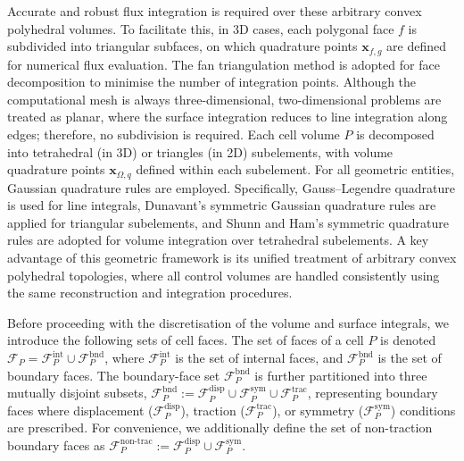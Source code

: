 \documentclass[review,3p]{elsarticle}
\newcommand{\bb}{\boldsymbol}
\begin{document}
%
%
Accurate and robust flux integration is required over these arbitrary convex polyhedral volumes.
To facilitate this, in 3D cases, each polygonal face $f$ is subdivided into triangular subfaces,
on which quadrature points $\bb{x}_{f,g}$ are defined for numerical flux evaluation.
The fan triangulation method is adopted for face decomposition to minimise the number of integration points.
Although the computational mesh is always three-dimensional, two-dimensional problems are treated as planar, where the surface integration reduces to line integration along edges; therefore, no subdivision is required.
Each cell volume $P$ is decomposed into tetrahedral (in 3D) or triangles (in 2D) subelements, with volume quadrature points $\bb{x}_{\Omega,q}$ defined within each subelement.
For all geometric entities, Gaussian quadrature rules are employed.
Specifically, Gauss–Legendre quadrature is used for line integrals,
Dunavant’s symmetric Gaussian quadrature rules \cite{Dunavant1985} are applied for triangular subelements,
and Shunn and Ham’s symmetric quadrature rules \cite{Shunn2012} are adopted for volume integration over tetrahedral subelements.
A key advantage of this geometric framework is its unified treatment of arbitrary convex polyhedral topologies, where all control volumes are handled consistently using the same reconstruction and integration procedures.

Before proceeding with the discretisation of the volume and surface integrals, we introduce the following sets of cell faces.
The set of faces of a cell $P$ is denoted $\mathcal{F}_P=\mathcal{F}^{\text{int}}_P \cup \mathcal{F}^{\text{bnd}}_P$, 
where $\mathcal{F}_P^{\text{int}}$ is the set of internal faces, and $\mathcal{F}_P^{\text{bnd}}$ is the set of boundary faces.
The boundary-face set $\mathcal{F}_P^{\text{bnd}}$ is further partitioned into three mutually disjoint subsets,
$\mathcal{F}_P^{\mathrm{bnd}} := \mathcal{F}_P^{\text{disp}} \cup \mathcal{F}_P^{\text{sym}} \cup \mathcal{F}_P^{\text{trac}}$,
representing boundary faces where displacement ($\mathcal{F}_P^{\text{disp}}$), traction ($\mathcal{F}_P^{\text{trac}}$),
or symmetry ($\mathcal{F}_P^{\text{sym}}$) conditions are prescribed. For convenience, we additionally define the set of non-traction boundary faces as $\mathcal{F}_P^{\text{non-trac}} := \mathcal{F}_P^{\text{disp}} \cup \mathcal{F}_P^{\text{sym}}$.
%
\end{document}
